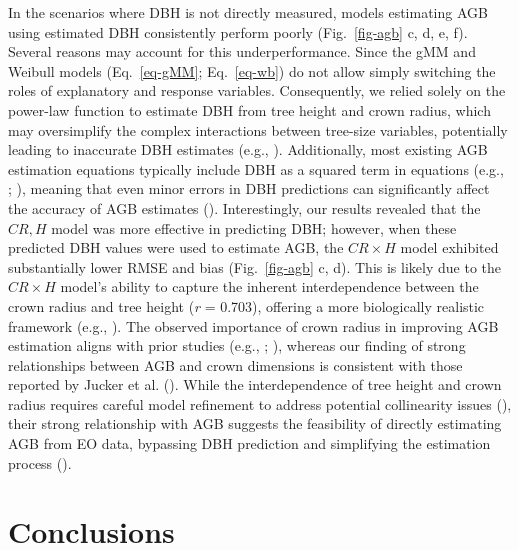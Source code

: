 \documentclass[
  12pt,
  letterpaper,
  DIV=11,
  numbers=noendperiod]{scrartcl}
\begin{document}
In the scenarios where DBH is not directly measured, models estimating
AGB using estimated DBH consistently perform poorly (Fig.~\ref{fig-agb}
c, d, e, f). Several reasons may account for this underperformance.
Since the gMM and Weibull models (Eq.~\ref{eq-gMM}; Eq.~\ref{eq-wb}) do
not allow simply switching the roles of explanatory and response
variables. Consequently, we relied solely on the power-law function to
estimate DBH from tree height and crown radius, which may oversimplify
the complex interactions between tree-size variables, potentially
leading to inaccurate DBH estimates (e.g.,
). Additionally, most
existing AGB estimation equations typically include DBH as a squared
term in equations (e.g., ;
), meaning that even minor
errors in DBH predictions can significantly affect the accuracy of AGB
estimates ().
Interestingly, our results revealed that the \(CR,H\) model was more
effective in predicting DBH; however, when these predicted DBH values
were used to estimate AGB, the \(CR \times H\) model exhibited
substantially lower RMSE and bias (Fig.~\ref{fig-agb} c, d). This is
likely due to the \(CR \times H\) model's ability to capture the
inherent interdependence between the crown radius and tree height
(\emph{r} = 0.703), offering a more biologically realistic framework
(e.g., ). The observed
importance of crown radius in improving AGB estimation aligns with prior
studies (e.g., ;
), whereas our finding of
strong relationships between AGB and crown dimensions is consistent with
those reported by Jucker et al. (). While
the interdependence of tree height and crown radius requires careful
model refinement to address potential collinearity issues
(), their strong
relationship with AGB suggests the feasibility of directly estimating
AGB from EO data, bypassing DBH prediction and simplifying the
estimation process ().

\section{Conclusions}\label{conclusions}
\end{document}

